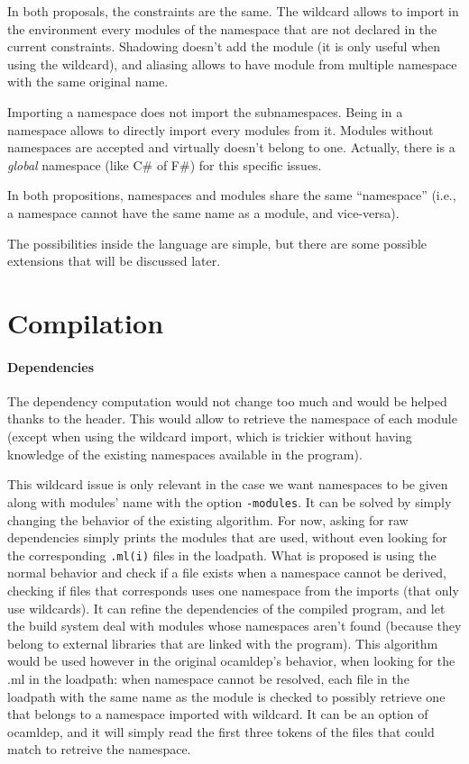 \documentclass[11pt,a4paper]{article}
\begin{document}
\medskip

In both proposals, the constraints are the same. The wildcard allows to import
in the environment every modules of the namespace that are not declared in the
current constraints. Shadowing doesn't add the module (it is only useful when
using the wildcard), and aliasing allows to have module from multiple namespace
with the same original name.

Importing a namespace does not import the subnamespaces. Being in a namespace
allows to directly import every modules from it. Modules without namespaces are
accepted and virtually doesn't belong to one. Actually, there is a \emph{global}
namespace (like C\# of F\#) for this specific issues.


In both propositions, namespaces and modules share the same ``namespace'' (i.e.,
a namespace cannot have the same name as a module, and vice-versa).

The possibilities inside the language are simple, but there are some possible
extensions that will be discussed later.

\section{Compilation}

\paragraph{Dependencies}

The dependency computation would not change too much and would be helped thanks
to the header. This would allow to retrieve the namespace of each module (except
when using the wildcard import, which is trickier without having knowledge of
the existing namespaces available in the program).

This wildcard issue is only relevant in the case we want namespaces to be given
along with modules' name with the option \texttt{-modules}. It can be solved by
simply changing the behavior of the existing algorithm. For now, asking for raw
dependencies simply prints the modules that are used, without even looking for
the corresponding \texttt{.ml(i)} files in the loadpath. What is proposed is
using the normal behavior and check if a file exists when a namespace cannot be
derived, checking if files that corresponds uses one namespace from the imports
(that only use wildcards). It can refine the dependencies of the compiled
program, and let the build system deal with modules whose namespaces aren't
found (because they belong to external libraries that are linked with the
program). This algorithm would be used however in the original ocamldep's
behavior, when looking for the .ml in the loadpath: when namespace cannot be
resolved, each file in the loadpath with the same name as the module is checked
to possibly retrieve one that belongs to a namespace imported with wildcard. It
can be an option of ocamldep, and it will simply read the first three tokens of
the files that could match to retreive the namespace.
\end{document}
